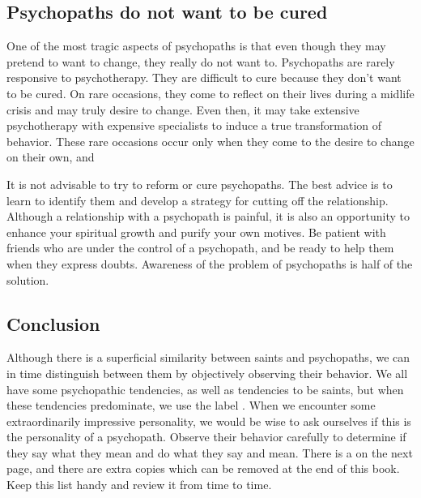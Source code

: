 \documentclass[a5paper,10pt,english]{book}
\begin{document}
\subsection{Psychopaths do not want to be cured}
\label{\detokenize{psychopaths:psychopaths-do-not-want-to-be-cured}}
\sphinxAtStartPar
One of the most tragic aspects of psychopaths is that even though they
may pretend to want to change, they really do not want to. Psychopaths
are rarely responsive to psychotherapy. They are difficult to cure
because they don’t want to be cured. On rare occasions, they come to
reflect on their lives during a mid\sphinxhyphen{}life crisis and may truly desire to
change. Even then, it may take extensive psychotherapy with expensive
specialists to induce a true transformation of behavior. These rare
occasions occur only when they come to the desire to change on their
own, and 

\sphinxAtStartPar
It is not advisable to try to reform or cure psychopaths. The
best advice is to learn to identify them and develop a strategy for
cutting off the relationship. Although a relationship with a psychopath
is painful, it is also an opportunity to enhance your spiritual growth
and purify your own motives. Be patient with friends who are under the
control of a psychopath, and be ready to help them when they express
doubts. Awareness of the problem of psychopaths is half of the solution.


\subsection{Conclusion}
\label{\detokenize{psychopaths:conclusion}}
\sphinxAtStartPar
Although there is a superficial similarity between saints and
psychopaths, we can in time distinguish between them by objectively
observing their behavior. We all have some psychopathic tendencies, as
well as tendencies to be saints, but when these tendencies predominate,
we use the label . When we encounter some
extraordinarily impressive personality, we would be wise to ask
ourselves if this is the personality of a psychopath. Observe their
behavior carefully to determine if they say what they mean and do what
they say and mean. There is a 
on the next page, and there are extra copies which can be removed at
the end of this book. Keep this list handy and review it from time to
time.
\end{document}
